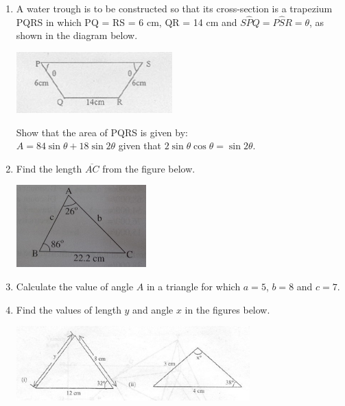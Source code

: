 \begin{enumerate}
	\item A water trough is to be constructed so that its cross-section is a trapezium PQRS in which PQ = RS = 6 cm, QR = 14 cm and $S\hat{P}Q = P\hat{S}R = \theta$, as shown in the diagram below.
	\begin{center}
	\includegraphics[width=6cm]{./img/trig5.jpg}
	\end{center}
	Show that the area of PQRS is given by:\\
	$A = 84\sin \theta + 18\sin 2\theta$ given that $2\sin \theta \cos \theta = \sin 2\theta$.
	

	\item Find the length $\overline{AC}$ from the figure below.
	\begin{center}
	\includegraphics[width=5cm]{./img/trig7.jpg}
	\end{center}

	\item Calculate the value of angle $A$ in a triangle for which $a = 5$, $b = 8$ and $c = 7$.
	
	\item Find the values of length $y$ and angle $x$ in the figures below.
	\begin{center}
	\includegraphics[width=9cm]{./img/trig2.jpg}
	\end{center}



\end{enumerate}	
	
	
	
	
